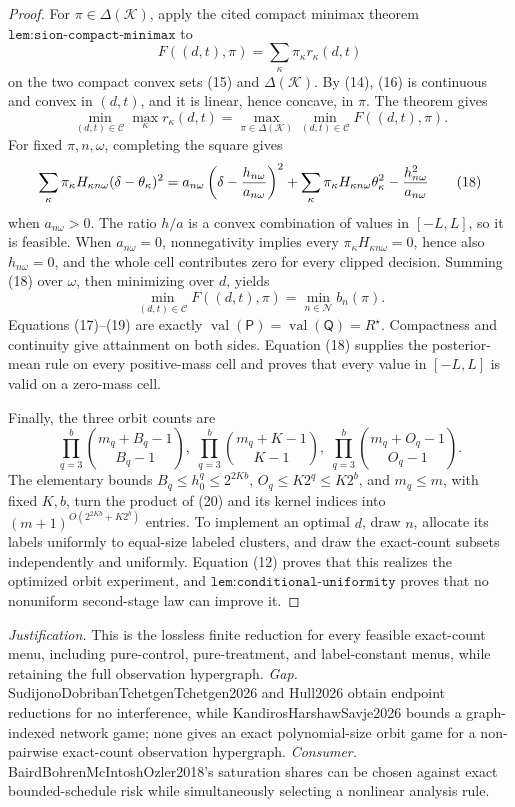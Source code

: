 \documentclass{article}
\begin{document}
\begin{proof}
For \(\pi\in\Delta(\mathcal K)\), apply the cited compact minimax theorem \(\texttt{lem:sion-compact-minimax}\) to
\[
 F((d,t),\pi)=\sum_\kappa\pi_\kappa r_\kappa(d,t)                         \tag{16}
\]
on the two compact convex sets (15) and \(\Delta(\mathcal K)\).  By (14), (16) is continuous and convex in \((d,t)\), and it is linear, hence concave, in \(\pi\).  The theorem gives
\[
 \min_{(d,t)\in\mathcal C}\max_\kappa r_\kappa(d,t)
 =\max_{\pi\in\Delta(\mathcal K)}\min_{(d,t)\in\mathcal C}F((d,t),\pi). \tag{17}
\]
For fixed \(\pi,n,\omega\), completing the square gives
\[
 \sum_\kappa\pi_\kappa H_{\kappa n\omega}
       (\delta-\theta_\kappa)^2
 =a_{n\omega}\left(\delta-{h_{n\omega}\over a_{n\omega}}\right)^2
  +\sum_\kappa\pi_\kappa H_{\kappa n\omega}\theta_\kappa^2
  -{h_{n\omega}^2\over a_{n\omega}}                                      \tag{18}
\]
when \(a_{n\omega}>0\).  The ratio \(h/a\) is a convex combination of values in \([-L,L]\), so it is feasible.  When \(a_{n\omega}=0\), nonnegativity implies every \(\pi_\kappa H_{\kappa n\omega}=0\), hence also \(h_{n\omega}=0\), and the whole cell contributes zero for every clipped decision.  Summing (18) over \(\omega\), then minimizing over \(d\), yields
\[
 \min_{(d,t)\in\mathcal C}F((d,t),\pi)=\min_{n\in\mathcal N}b_n(\pi).     \tag{19}
\]
Equations (17)--(19) are exactly \(\operatorname{val}(\mathsf P)=\operatorname{val}(\mathsf Q)=R^\star\).  Compactness and continuity give attainment on both sides.  Equation (18) supplies the posterior-mean rule on every positive-mass cell and proves that every value in \([-L,L]\) is valid on a zero-mass cell.

Finally, the three orbit counts are
\[
 \prod_{q=3}^b\binom{m_q+B_q-1}{B_q-1},\;
 \prod_{q=3}^b\binom{m_q+K-1}{K-1},\;
 \prod_{q=3}^b\binom{m_q+O_q-1}{O_q-1}.                                   \tag{20}
\]
The elementary bounds \(B_q\le h_0^q\le2^{2Kb}\), \(O_q\le K2^q\le K2^b\), and \(m_q\le m\), with fixed \(K,b\), turn the product of (20) and its kernel indices into
\(
 (m+1)^{O(2^{2Kb}+K2^b)}
\)
entries.  To implement an optimal \(d\), draw \(n\), allocate its labels uniformly to equal-size labeled clusters, and draw the exact-count subsets independently and uniformly.  Equation (12) proves that this realizes the optimized orbit experiment, and \(\texttt{lem:conditional-uniformity}\) proves that no nonuniform second-stage law can improve it.
\end{proof}
\par\smallskip\noindent \textit{Justification.} This is the lossless finite reduction for every feasible exact-count menu, including pure-control, pure-treatment, and label-constant menus, while retaining the full observation hypergraph. \textit{Gap.} SudijonoDobribanTchetgenTchetgen2026 and Hull2026 obtain endpoint reductions for no interference, while KandirosHarshawSavje2026 bounds a graph-indexed network game; none gives an exact polynomial-size orbit game for a non-pairwise exact-count observation hypergraph. \textit{Consumer.} BairdBohrenMcIntoshOzler2018's saturation shares can be chosen against exact bounded-schedule risk while simultaneously selecting a nonlinear analysis rule.
\end{document}
